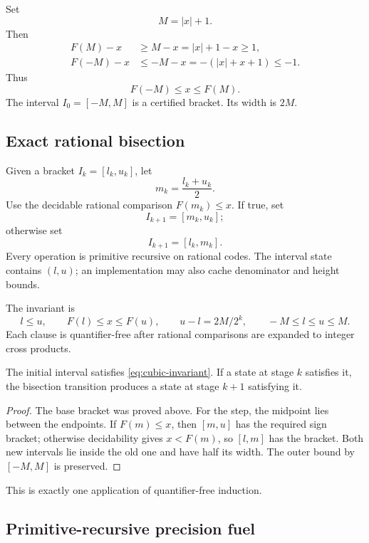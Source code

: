 Set
\[
 M=|x|+1.
\]
Then
\begin{align*}
 F(M)-x &\ge M-x = |x|+1-x\ge1,\\
 F(-M)-x &\le -M-x =-(|x|+x+1)\le-1.
\end{align*}
Thus
\[
 F(-M)\le x\le F(M).
\]
The interval \(I_0=[-M,M]\) is a certified bracket.  Its width is \(2M\).

\subsection{Exact rational bisection}

Given a bracket \(I_k=[l_k,u_k]\), let
\[
 m_k=\frac{l_k+u_k}{2}.
\]
Use the decidable rational comparison \(F(m_k)\le x\).  If true, set
\[
 I_{k+1}=[m_k,u_k];
\]
otherwise set
\[
 I_{k+1}=[l_k,m_k].
\]
Every operation is primitive recursive on rational codes.  The interval state contains \((l,u)\); an implementation may also cache denominator and height bounds.

The invariant is
\begin{equation}\label{eq:cubic-invariant}
 l\le u,
 \qquad F(l)\le x\le F(u),
 \qquad u-l=2M/2^k,
 \qquad -M\le l\le u\le M.
\end{equation}
Each clause is quantifier-free after rational comparisons are expanded to integer cross products.

\begin{lemma}\label{lem:cubic-bisect}
The initial interval satisfies \eqref{eq:cubic-invariant}.  If a state at stage \(k\) satisfies it, the bisection transition produces a state at stage \(k+1\) satisfying it.
\end{lemma}

\begin{proof}
The base bracket was proved above.  For the step, the midpoint lies between the endpoints.  If \(F(m)\le x\), then \([m,u]\) has the required sign bracket; otherwise decidability gives \(x<F(m)\), so \([l,m]\) has the bracket.  Both new intervals lie inside the old one and have half its width.  The outer bound by \([-M,M]\) is preserved.
\end{proof}

This is exactly one application of quantifier-free induction.

\subsection{Primitive-recursive precision fuel}

